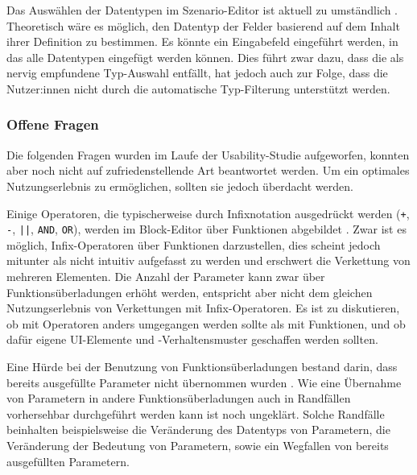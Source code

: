 Das Auswählen der Datentypen im Szenario-Editor ist aktuell zu umständlich . Theoretisch wäre es möglich, den Datentyp der Felder basierend auf dem Inhalt ihrer Definition zu bestimmen. Es könnte ein Eingabefeld eingeführt werden, in das alle Datentypen eingefügt werden können. Dies führt zwar dazu, dass die als nervig empfundene Typ-Auswahl entfällt, hat jedoch auch zur Folge, dass die Nutzer:innen nicht durch die automatische Typ-Filterung unterstützt werden.


\subsubsection{Offene Fragen}

Die folgenden Fragen wurden im Laufe der Usability-Studie aufgeworfen, konnten aber noch nicht auf zufriedenstellende Art beantwortet werden. Um ein optimales Nutzungserlebnis zu ermöglichen, sollten sie jedoch überdacht werden.

\pskip
Einige Operatoren, die typischerweise durch Infixnotation ausgedrückt werden (\texttt{+}, \texttt{-}, \texttt{||}, \texttt{AND}, \texttt{OR}), werden im Block-Editor über Funktionen abgebildet . Zwar ist es möglich, Infix-Operatoren über Funktionen darzustellen, dies scheint jedoch mitunter als nicht intuitiv aufgefasst zu werden und erschwert die Verkettung von mehreren Elementen. Die Anzahl der Parameter kann zwar über Funktionsüberladungen erhöht werden, entspricht aber nicht dem gleichen Nutzungserlebnis von Verkettungen mit Infix-Operatoren. Es ist zu diskutieren, ob mit Operatoren anders umgegangen werden sollte als mit Funktionen, und ob dafür eigene UI-Elemente und -Verhaltensmuster geschaffen werden sollten.

\pskip
Eine Hürde bei der Benutzung von Funktionsüberladungen bestand darin, dass bereits ausgefüllte Parameter nicht übernommen wurden . Wie eine Übernahme von Parametern in andere Funktionsüberladungen auch in Randfällen vorhersehbar durchgeführt werden kann ist noch ungeklärt. Solche Randfälle beinhalten beispielsweise die Veränderung des Datentyps von Parametern, die Veränderung der Bedeutung von Parametern, sowie ein Wegfallen von bereits ausgefüllten Parametern.


